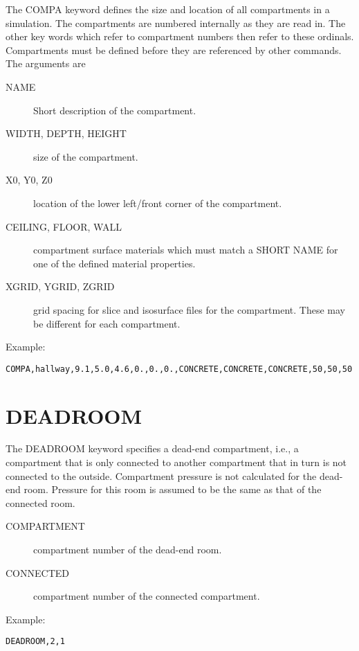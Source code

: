 The COMPA keyword defines the size and location of all compartments in a simulation. The compartments are numbered internally as they are read in. The other key words which refer to compartment numbers then refer to these ordinals. Compartments must be defined before they are referenced by other commands.   The arguments are
\begin{adjustwidth}{1cm}{0cm}
\begin{description}
  \item[NAME] Short description of the compartment.
  \item[WIDTH, DEPTH, HEIGHT] size of the compartment.
  \item[X0, Y0, Z0] location of the lower left/front corner of the compartment.
   \item[CEILING, FLOOR, WALL] compartment surface materials which must match a SHORT NAME for one of the defined material properties.
   \item[XGRID, YGRID, ZGRID] grid spacing for slice and isosurface files for the compartment. These may be different for each compartment.
\end{description}
\end{adjustwidth}

\noindent Example:
\begin{lstlisting}
COMPA,hallway,9.1,5.0,4.6,0.,0.,0.,CONCRETE,CONCRETE,CONCRETE,50,50,50
\end{lstlisting}

\section{DEADROOM}

The DEADROOM keyword specifies a dead-end compartment, i.e., a compartment that is only connected to another compartment that in turn is not connected to the outside.  Compartment pressure is not calculated for the dead-end room. Pressure for this room is assumed to be the same as that of the connected room.
\begin{adjustwidth}{1cm}{0cm}
\begin{description}
  \item[COMPARTMENT] compartment number of the dead-end room.
  \item[CONNECTED] compartment number of the connected compartment.
\end{description}
\end{adjustwidth}

\noindent Example:
\begin{lstlisting}
DEADROOM,2,1
\end{lstlisting}

